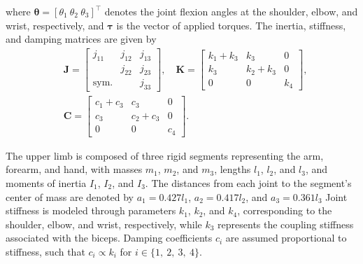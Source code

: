     where $\bm{\theta} = [\theta_1\ \theta_2\ \theta_3]^\top$ denotes the joint flexion angles at the shoulder, elbow, and wrist, respectively, and $\bm{\tau}$ is the vector of applied torques. 
    The inertia, stiffness, and damping matrices are given by
    \begin{equation}
    \begin{aligned}
        &\mathbf{J} =
        \begin{bmatrix}
            j_{11} & j_{12} & j_{13} \\
                   & j_{22} & j_{23} \\
            \text{sym.} & & j_{33}
        \end{bmatrix}, \quad 
        \mathbf{K} =
        \begin{bmatrix}
            k_1 + k_3 & k_3       & 0 \\
            k_3       & k_2 + k_3 & 0 \\
            0         & 0         & k_4
        \end{bmatrix},\\[1mm]
        &\mathbf{C} =
        \begin{bmatrix}
            c_1 + c_3 & c_3       & 0 \\
            c_3       & c_2 + c_3 & 0 \\
            0         & 0         & c_4
        \end{bmatrix}.
    \end{aligned}
    \end{equation}
    
    The upper limb is composed of three rigid segments representing the arm, forearm, and hand, with masses $m_1$, $m_2$, and $m_3$, lengths $l_1$, $l_2$, and $l_3$, and moments of inertia $I_1$, $I_2$, and $I_3$. The distances from each joint to the segment's center of mass are denoted by $a_1 = 0.427l_1$, $a_2 = 0.417l_2$, and $a_3 = 0.361l_3$
    Joint stiffness is modeled through parameters $k_1$, $k_2$, and $k_4$, corresponding to the shoulder, elbow, and wrist, respectively, while $k_3$ represents the coupling stiffness associated with the biceps. Damping coefficients $c_i$ are assumed proportional to stiffness, such that $c_i \propto k_i$ for $i \in \{1,\ 2,\ 3,\ 4\}$.
    
